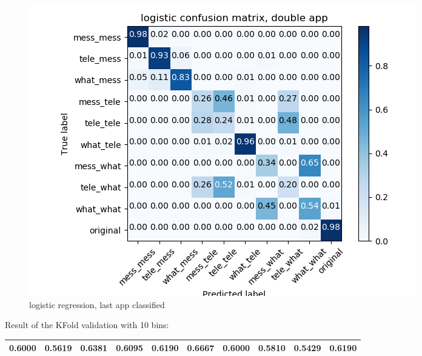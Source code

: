  \begin{figure}[H] 
\centering 
\includegraphics[scale=.6]{images/new_met_lr_initial_double_complete.png} 
\caption{logistic regression, last app classified} 
\end{figure} 


Result of the KFold validation with 10 bins:
 {\def\arraystretch{1.3} 
 \begin{table}[H] 
\centering 
\begin{tabular}{|l |l |l |l |l |l |l |l |l |l |}  
\hline 
0.6000&
0.5619&
0.6381&
0.6095&
0.6190&
0.6667&
0.6000&
0.5810&
0.5429&
0.6190\\ \hline  

\end{tabular} 
\end{table} }

